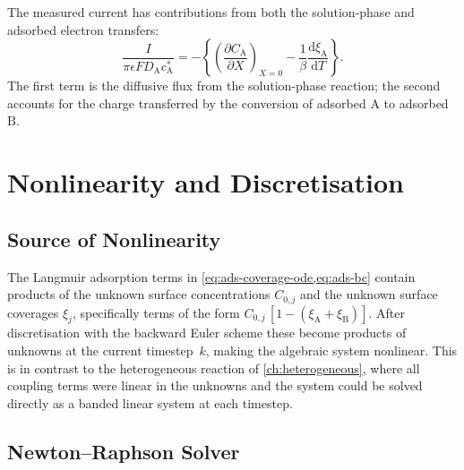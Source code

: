 The measured current has contributions from both the solution-phase and
adsorbed electron transfers:
\begin{equation}\label{eq:ads-current}
  \frac{I}{\pi\epsilon F D_\mathrm{A} c_\mathrm{A}^*}
  = -\left\{
    \left(\frac{\partial C_\mathrm{A}}{\partial X}\right)_{X=0}
    - \frac{1}{\beta}
    \frac{\mathrm{d}\xi_\mathrm{A}}{\mathrm{d}T}
  \right\}.
\end{equation}
The first term is the diffusive flux from the solution-phase reaction;
the second accounts for the charge transferred by the conversion of
adsorbed $\mathrm{A}$ to adsorbed $\mathrm{B}$.

\section{Nonlinearity and Discretisation}\label{sec:ads-disc}

\subsection{Source of Nonlinearity}

The Langmuir adsorption terms in \cref{eq:ads-coverage-ode,eq:ads-bc}
contain products of the unknown surface concentrations $C_{0,j}$ and
the unknown surface coverages $\xi_j$, specifically terms of the form
$C_{0,j}\,[1 - (\xi_\mathrm{A} + \xi_\mathrm{B})]$. After
discretisation with the backward Euler scheme these become products of
unknowns at the current timestep~$k$, making the algebraic system
nonlinear. This is in contrast to the heterogeneous reaction of
\cref{ch:heterogeneous}, where all coupling terms were linear in the
unknowns and the system could be solved directly as a banded linear
system at each timestep.

\subsection{Newton--Raphson Solver}\label{sec:ads-newton}

